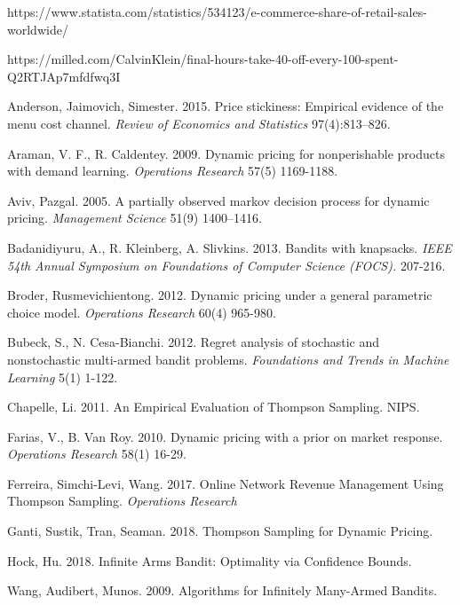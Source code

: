 \documentclass[a4paper]{article}
\begin{document}
\begin{thebibliography}{9}
	https://www.statista.com/statistics/534123/e-commerce-share-of-retail-sales-worldwide/
	
	https://milled.com/CalvinKlein/final-hours-take-40-off-every-100-spent-Q2RTJAp7mfdfwq3I
	
	Anderson, Jaimovich, Simester. 2015. Price stickiness: Empirical evidence of the menu cost channel. \emph{Review of Economics and Statistics} 97(4):813–826.
	
	Araman, V. F., R. Caldentey. 2009. Dynamic pricing for nonperishable products with demand learning.
	\emph{Operations Research} 57(5) 1169-1188.
	
	Aviv, Pazgal. 2005. A partially observed markov decision process for dynamic
	pricing. \emph{Management Science} 51(9) 1400–1416.
	
	Badanidiyuru, A., R. Kleinberg, A. Slivkins. 2013. Bandits with knapsacks. \emph{IEEE 54th Annual Symposium on Foundations of Computer Science (FOCS).} 207-216.	
	
	Broder, Rusmevichientong. 2012. Dynamic pricing under a general parametric choice model. \emph{Operations Research} 60(4) 965-980.
	
	Bubeck, S., N. Cesa-Bianchi. 2012. Regret analysis of stochastic and nonstochastic multi-armed bandit problems. \emph{Foundations and Trends in Machine Learning} 5(1) 1-122.
	
	Chapelle,  Li. 2011. An Empirical Evaluation of Thompson Sampling. NIPS. 
	
	Farias, V., B. Van Roy. 2010. Dynamic pricing with a prior on market response. \emph{Operations Research} 58(1) 16-29.
	
	Ferreira, Simchi-Levi, Wang. 2017. Online Network Revenue Management Using Thompson Sampling. \emph{Operations Research}
	
	Ganti, Sustik, Tran, Seaman. 2018. Thompson Sampling for Dynamic Pricing. 
	
	Hock, Hu. 2018. Infinite Arms Bandit: Optimality via Confidence Bounds.
	
	Wang, Audibert, Munos. 2009. Algorithms for Infinitely Many-Armed Bandits.
\end{thebibliography}
\end{document}
